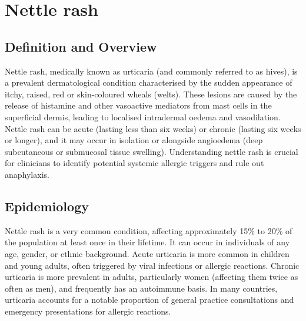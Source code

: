\chapter{Nettle rash}

\section*{Definition and Overview}
Nettle rash, medically known as urticaria (and commonly referred to as hives), is a prevalent dermatological condition characterised by the sudden appearance of itchy, raised, red or skin-coloured wheals (welts). These lesions are caused by the release of histamine and other vasoactive mediators from mast cells in the superficial dermis, leading to localised intradermal oedema and vasodilation. Nettle rash can be acute (lasting less than six weeks) or chronic (lasting six weeks or longer), and it may occur in isolation or alongside angioedema (deep subcutaneous or submucosal tissue swelling). Understanding nettle rash is crucial for clinicians to identify potential systemic allergic triggers and rule out anaphylaxis.

\section*{Epidemiology}
Nettle rash is a very common condition, affecting approximately 15\% to 20\% of the population at least once in their lifetime. It can occur in individuals of any age, gender, or ethnic background. Acute urticaria is more common in children and young adults, often triggered by viral infections or allergic reactions. Chronic urticaria is more prevalent in adults, particularly women (affecting them twice as often as men), and frequently has an autoimmune basis. In many countries, urticaria accounts for a notable proportion of general practice consultations and emergency presentations for allergic reactions.


